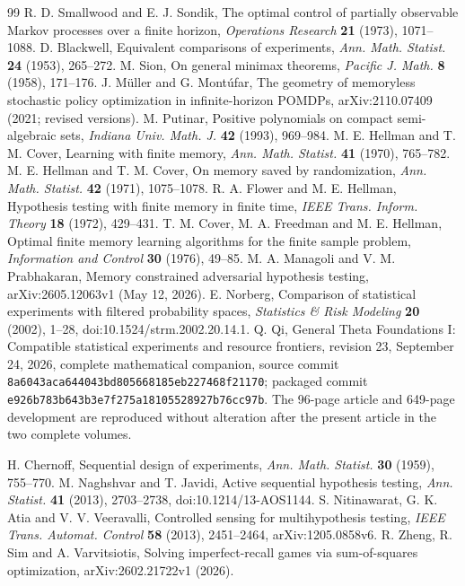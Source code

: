 \documentclass[11pt]{amsart}
\theoremstyle{definition}\newtheorem{definition}[theorem]{Definition}
\theoremstyle{remark}\newtheorem{remark}[theorem]{Remark}
\newcommand{\1}{\mathbf 1}
\begin{document}
\begin{thebibliography}{99}
 R. D. Smallwood and E. J. Sondik,
The optimal control of partially observable Markov processes over a finite horizon,
\emph{Operations Research} \textbf{21} (1973), 1071--1088.
 D. Blackwell, Equivalent comparisons of experiments,
\emph{Ann. Math. Statist.} \textbf{24} (1953), 265--272.
 M. Sion, On general minimax theorems,
\emph{Pacific J. Math.} \textbf{8} (1958), 171--176.
 J. M\"uller and G. Mont\'ufar, The geometry of memoryless
stochastic policy optimization in infinite-horizon POMDPs,
arXiv:2110.07409 (2021; revised versions).
 M. Putinar, Positive polynomials on compact semi-algebraic
sets, \emph{Indiana Univ. Math. J.} \textbf{42} (1993), 969--984.
 M. E. Hellman and T. M. Cover, Learning with finite memory,
\emph{Ann. Math. Statist.} \textbf{41} (1970), 765--782.
 M. E. Hellman and T. M. Cover, On memory saved by
randomization, \emph{Ann. Math. Statist.} \textbf{42} (1971), 1075--1078.
 R. A. Flower and M. E. Hellman, Hypothesis testing with
finite memory in finite time, \emph{IEEE Trans. Inform. Theory}
\textbf{18} (1972), 429--431.
 T. M. Cover, M. A. Freedman and M. E. Hellman, Optimal
finite memory learning algorithms for the finite sample problem,
\emph{Information and Control} \textbf{30} (1976), 49--85.
 M. A. Managoli and V. M. Prabhakaran, Memory constrained
adversarial hypothesis testing, arXiv:2605.12063v1 (May 12, 2026).
 E. Norberg, Comparison of statistical experiments with
filtered probability spaces, \emph{Statistics \& Risk Modeling}
\textbf{20} (2002), 1--28, doi:10.1524/strm.2002.20.14.1.
 Q. Qi, General Theta Foundations I: Compatible
statistical experiments and resource frontiers, revision 23,
September 24, 2026, complete mathematical companion, source commit
\texttt{8a6043aca644043bd805668185eb227468f21170}; packaged commit
\texttt{e926b783b643b3e7f275a18105528927b76cc97b}.
The 96-page article and 649-page development are reproduced without
alteration after the present article in the two complete volumes.

 H. Chernoff, Sequential design of experiments,
\emph{Ann. Math. Statist.} \textbf{30} (1959), 755--770.
 M. Naghshvar and T. Javidi, Active sequential hypothesis
testing, \emph{Ann. Statist.} \textbf{41} (2013), 2703--2738,
doi:10.1214/13-AOS1144.
 S. Nitinawarat, G. K. Atia and V. V. Veeravalli,
Controlled sensing for multihypothesis testing,
\emph{IEEE Trans. Automat. Control} \textbf{58} (2013), 2451--2464,
arXiv:1205.0858v6.
 R. Zheng, R. Sim and A. Varvitsiotis,
Solving imperfect-recall games via sum-of-squares optimization,
arXiv:2602.21722v1 (2026).



\end{thebibliography}
\end{document}
